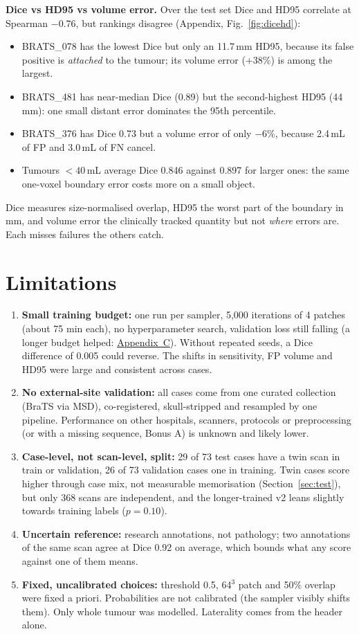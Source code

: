 \documentclass[10pt,a4paper]{article}
\newcommand{\mL}{\,mL}
\newcommand{\mm}{\,mm}
\begin{document}
\textbf{Dice vs HD95 vs volume error.} Over the test set Dice and HD95 correlate at Spearman $-0.76$, but rankings disagree (Appendix, Fig.~\ref{fig:dicehd}):
\begin{itemize}
\item BRATS\_078 has the lowest Dice but only an 11.7\mm{} HD95, because its false positive is \emph{attached} to the tumour; its volume error (+38\%) is among the largest.
\item BRATS\_481 has near-median Dice (0.89) but the second-highest HD95 (44\mm): one small distant error dominates the 95th percentile.
\item BRATS\_376 has Dice 0.73 but a volume error of only $-6$\%, because 2.4\mL{} of FP and 3.0\mL{} of FN cancel.
\item Tumours $<40$\mL{} average Dice 0.846 against 0.897 for larger ones: the same one-voxel boundary error costs more on a small object.
\end{itemize}
Dice measures size-normalised overlap, HD95 the worst part of the boundary in mm, and volume error the clinically tracked quantity but not \emph{where} errors are. Each misses failures the others catch.\enlargethispage{\baselineskip}

\section{Limitations}
\begin{enumerate}
\item \textbf{Small training budget:} one run per sampler, 5{,}000 iterations of 4 patches (about 75 min each), no hyperparameter search, validation loss still falling (a longer budget helped: \hyperref[sec:v2]{Appendix~C}). Without repeated seeds, a Dice difference of 0.005 could reverse. The shifts in sensitivity, FP volume and HD95 were large and consistent across cases.
\item \textbf{No external-site validation:} all cases come from one curated collection (BraTS via MSD), co-registered, skull-stripped and resampled by one pipeline. Performance on other hospitals, scanners, protocols or preprocessing (or with a missing sequence, Bonus A) is unknown and likely lower.
\item \textbf{Case-level, not scan-level, split:} 29 of 73 test cases have a twin scan in train or validation, 26 of 73 validation cases one in training. Twin cases score higher through case mix, not measurable memorisation (Section~\ref{sec:test}), but only 368 scans are independent, and the longer-trained v2 leans slightly towards training labels ($p=0.10$).
\item \textbf{Uncertain reference:} research annotations, not pathology; two annotations of the same scan agree at Dice 0.92 on average, which bounds what any score against one of them means.
\item \textbf{Fixed, uncalibrated choices:} threshold 0.5, 64$^3$ patch and 50\% overlap were fixed a priori. Probabilities are not calibrated (the sampler visibly shifts them). Only whole tumour was modelled. Laterality comes from the header alone.
\end{enumerate}
\end{document}
